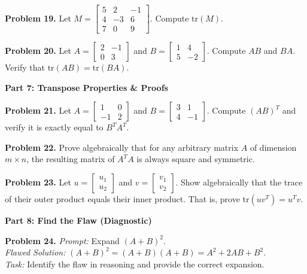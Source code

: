 \documentclass[11pt]{article}
\begin{document}
\noindent \textbf{Problem 19.} Let $M = \begin{bmatrix} 5 & 2 & -1 \\ 4 & -3 & 6 \\ 7 & 0 & 9 \end{bmatrix}$. Compute $\text{tr}(M)$.

\noindent \textbf{Problem 20.} Let $A = \begin{bmatrix} 2 & -1 \\ 0 & 3 \end{bmatrix}$ and $B = \begin{bmatrix} 1 & 4 \\ 5 & -2 \end{bmatrix}$. Compute $AB$ and $BA$. Verify that $\text{tr}(AB) = \text{tr}(BA)$.

\vspace{0.5cm}
\textbf{Part 7: Transpose Properties \& Proofs}
\vspace{0.3cm}

\noindent \textbf{Problem 21.} Let $A = \begin{bmatrix} 1 & 0 \\ -1 & 2 \end{bmatrix}$ and $B = \begin{bmatrix} 3 & 1 \\ 4 & -1 \end{bmatrix}$. Compute $(AB)^T$ and verify it is exactly equal to $B^T A^T$.

\noindent \textbf{Problem 22.} Prove algebraically that for any arbitrary matrix $A$ of dimension $m \times n$, the resulting matrix of $A^T A$ is always square and symmetric. 

\noindent \textbf{Problem 23.} Let $u = \begin{bmatrix} u_1 \\ u_2 \end{bmatrix}$ and $v = \begin{bmatrix} v_1 \\ v_2 \end{bmatrix}$. Show algebraically that the trace of their outer product equals their inner product. That is, prove $\text{tr}(uv^T) = u^T v$.

\vspace{0.5cm}
\textbf{Part 8: Find the Flaw (Diagnostic)}
\vspace{0.3cm}

\noindent \textbf{Problem 24.} \textit{Prompt:} Expand $(A + B)^2$.\\
\textit{Flawed Solution:} $(A+B)^2 = (A+B)(A+B) = A^2 + 2AB + B^2$.\\
\textit{Task:} Identify the flaw in reasoning and provide the correct expansion.
\end{document}
